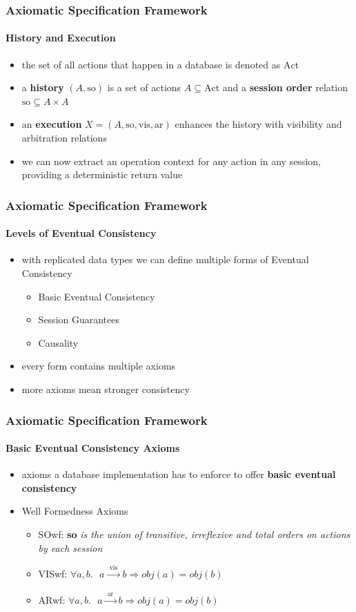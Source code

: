 \documentclass[11pt]{beamer}
\begin{document}
\begin{frame}
\frametitle{Axiomatic Specification Framework}
\framesubtitle{History and Execution}
\begin{itemize}
\item the set of all actions that happen in a database is denoted as \(\mathrm{Act}\)
\item a \textbf{history} \((A,\mathrm{so})\) is a set of actions \(A \subseteq \mathrm{Act}\) and a \textbf{session order} relation \(\mathrm{so} \subseteq A \times A \)
\item an \textbf{execution} \(X = (A, \mathrm{so, vis, ar})\) enhances the history with visibility and arbitration relations
\item we can now extract an operation context for any action in any session, providing a deterministic return value
\end{itemize}

\end{frame}

\begin{frame}
\frametitle{Axiomatic Specification Framework}
\framesubtitle{Levels of Eventual Consistency}
\begin{itemize}
\item with replicated data types we can define multiple forms of Eventual Consistency
\begin{itemize}
\item Basic Eventual Consistency
\item Session Guarantees
\item Causality
\end{itemize}
\item every form contains multiple axioms
\item more axioms mean stronger consistency
\end{itemize}
\end{frame}

\begin{frame}
\frametitle{Axiomatic Specification Framework}
\framesubtitle{Basic Eventual Consistency Axioms}
\begin{itemize}
\item axioms a database implementation has to enforce to offer \textbf{basic eventual consistency} 
\item Well Formedness Axioms
\begin{itemize}
\item SOwf: \textbf{so} \textit{is the union of transitive, irreflexive and total orders
on actions by each session}
\item VISwf: \(\forall a,b. \text{ } a \xrightarrow[]{\text{ vis }}b \Rightarrow obj(a) = obj(b) \)
\item ARwf: \(\forall a,b. \text{ } a \xrightarrow[]{\text{ ar }} b \Rightarrow obj(a) = obj(b) \)
\end{itemize}
\end{itemize}
\end{frame}
\end{document}
